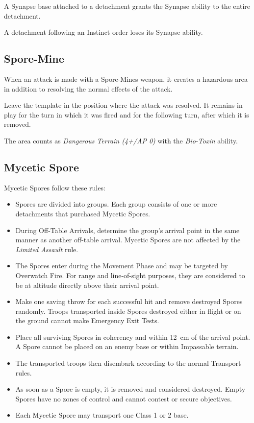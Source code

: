 A Synapse base attached to a detachment grants the Synapse ability to the entire detachment.

A detachment following an Instinct order loses its Synapse ability.

\subsection{Spore-Mine}

When an attack is made with a Spore-Mines weapon, it creates a hazardous area in addition to resolving the normal effects of the attack.

Leave the template in the position where the attack was resolved. It remains in play for the turn in which it was fired and for the following turn, after which it is removed.

The area counts as \textit{Dangerous Terrain (4+/AP 0)} with the \textit{Bio-Toxin} ability.

\subsection{Mycetic Spore}

Mycetic Spores follow these rules:

\begin{itemize}
    \item Spores are divided into groups. Each group consists of one or more detachments that purchased Mycetic Spores.

    \item During Off-Table Arrivals, determine the group's arrival point in the same manner as another off-table arrival. Mycetic Spores are not affected by the \textit{Limited Assault} rule.

    \item The Spores enter during the Movement Phase and may be targeted by Overwatch Fire. For range and line-of-sight purposes, they are considered to be at altitude directly above their arrival point.

    \item Make one saving throw for each successful hit and remove destroyed Spores randomly. Troops transported inside Spores destroyed either in flight or on the ground cannot make Emergency Exit Tests.

    \item Place all surviving Spores in coherency and within 12~cm of the arrival point. A Spore cannot be placed on an enemy base or within Impassable terrain.

    \item The transported troops then disembark according to the normal Transport rules.

    \item As soon as a Spore is empty, it is removed and considered destroyed. Empty Spores have no zones of control and cannot contest or secure objectives.

    \item Each Mycetic Spore may transport one Class 1 or 2 base.
\end{itemize}


